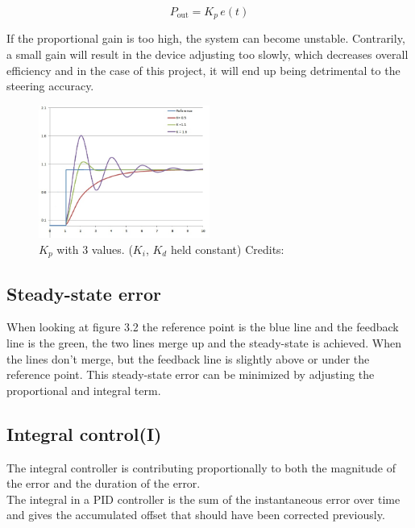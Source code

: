 $$ P_{\mathrm{out}}=K_p\,{e(t)}$$  

If the proportional gain is too high, the system can become unstable. Contrarily, a small gain will result in the device adjusting too slowly, which decreases overall efficiency and in the case of this project, it will end up being detrimental to the steering accuracy.


\begin{figure}[h!]
  \centering
  \includegraphics[width=0.5\textwidth]{figures/PIDP.jpg}
  
  \caption{$K_p$ with 3 values. ($K_i$, $K_d$ held constant) Credits: %
  }
  \label{PID controller}
\end{figure}

\subsection {Steady-state error}

When looking at figure 3.2 the reference point is the blue line and the feedback line is the green, the two lines merge up and the steady-state is achieved. When the lines don't merge, but the feedback line is slightly above or under the reference point. This steady-state error can be minimized by adjusting the proportional and integral term. 

\subsection {Integral control(I)}

The integral controller is contributing proportionally to both the magnitude of the error and the duration of the error. \\
The integral in a PID controller is the sum of the instantaneous error over time and gives the accumulated offset that should have been corrected previously. \\ 

